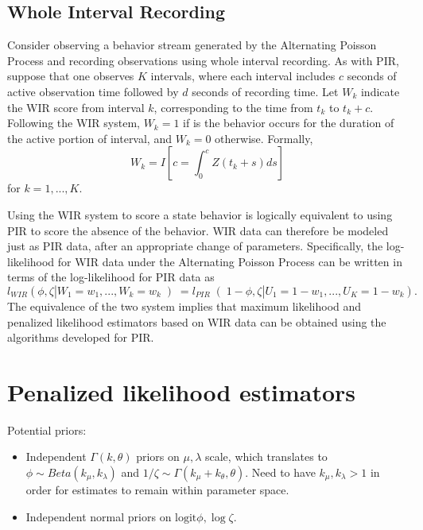 \documentclass[man, noextraspace, floatsintext]{apa6}\usepackage[]{graphicx}\usepackage[]{color}
\newcommand{\logit}{\text{logit}}
\begin{document}
\subsection{Whole Interval Recording}
\label{sec:WIR}

Consider observing a behavior stream generated by the Alternating Poisson Process and recording observations using whole interval recording. As with PIR, suppose that one observes $K$ intervals, where each interval includes $c$ seconds of active observation time followed by $d$ seconds of recording time. Let $W_k$ indicate the WIR score from interval $k$, corresponding to the time from $t_k$ to $t_k + c$. Following the WIR system, $W_k = 1$ if is the behavior occurs for the duration of the active portion of interval, and $W_k = 0$ otherwise. Formally, 
\begin{equation}
W_k = I\left[ c = \int_0^c Z\left(t_k + s \right) ds\right]
\end{equation}
for $k = 1,...,K$. 

Using the WIR system to score a state behavior is logically equivalent to using PIR to score the absence of the behavior. WIR data can therefore be modeled just as PIR data, after an appropriate change of parameters. Specifically, the log-likelihood for WIR data under the Alternating Poisson Process can be written in terms of the log-likelihood for PIR data as
\begin{equation}
l_{WIR}\left(\phi, \zeta | W_1 = w_1,...,W_k = w_k \left) = l_{PIR}\right(1 - \phi, \zeta | U_1 = 1 - w_1,...,U_K = 1 - w_k\right).
\end{equation}
The equivalence of the two system implies that maximum likelihood and penalized likelihood estimators based on WIR data can be obtained using the algorithms developed for PIR. 

\section{Penalized likelihood estimators}

Potential priors:
\begin{itemize}
\item Independent $\Gamma(k, \theta)$ priors on $\mu,\lambda$ scale, which translates to $\phi \sim Beta(k_\mu, k_\lambda)$ and $1 / \zeta \sim \Gamma(k_\mu + k_\theta, \theta)$. Need to have $k_\mu, k_\lambda > 1$ in order for estimates to remain within parameter space. 
\item Independent normal priors on $\logit \phi, \log \zeta$.
\end{itemize}
\end{document}
